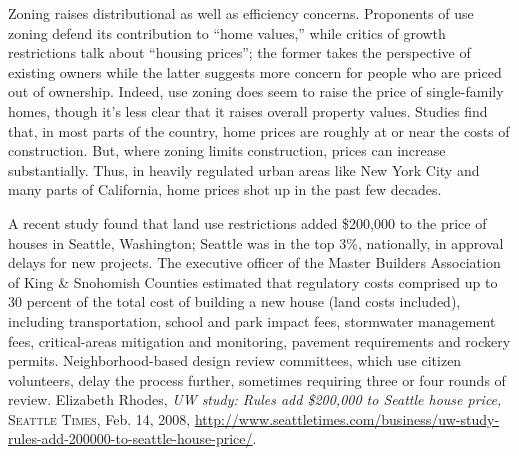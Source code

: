 Zoning raises distributional as well as efficiency concerns. Proponents of use
zoning defend its contribution to ``home values,'' while critics of growth
restrictions talk about ``housing prices''; the former takes the perspective of
existing owners while the latter suggests more concern for people who are priced
out of ownership. Indeed, use zoning does seem to raise the price of
single-family homes, though it's less clear that it raises overall property
values. Studies find that, in most parts of the country, home prices are roughly
at or near the costs of construction. But, where zoning limits construction,
prices can increase substantially. Thus, in heavily regulated urban areas like
New York City and many parts of California, home prices shot up in the past few
decades. 

A recent study found that land use restrictions added \$200,000 to the price of
houses in Seattle, Washington; Seattle was in the top 3\%, nationally, in
approval delays for new projects. The executive officer of the Master Builders
Association of King \& Snohomish Counties estimated that regulatory costs
comprised up to 30 percent of the total cost of building a new house (land costs
included), including transportation, school and park impact fees, stormwater
management fees, critical-areas mitigation and monitoring, pavement requirements
and rockery permits. Neighborhood-based design review committees, which use
citizen volunteers, delay the process further, sometimes requiring three or four
rounds of review. Elizabeth Rhodes, \emph{UW study: Rules add \$200,000 to
Seattle house price,} \textsc{Seattle Times}, Feb. 14, 2008,
\url{http://www.seattletimes.com/business/uw-study-rules-add-200000-to-seattle-house-price/}.



